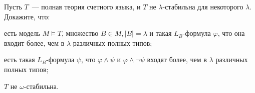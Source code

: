 Пусть $T$~--- полная теория счетного языка, и $T$ не $\lambda$-стабильна для некоторого
$\lambda$. Докажите, что:
\begin{enumcyr}
    \item есть модель $M \models T$, множество $B \in M, |B| = \lambda$ и такая $L_B$-формула $\varphi$,
        что она входит более, чем в $\lambda$ различных полных типов;
    \item есть такая $L_B$-формула $\psi$, что $\varphi \land \psi$ и $\varphi
        \land \neg \psi$ входят более, чем в $\lambda$ различных полных типов;
    \item $T$ не $\omega$-стабильна.
\end{enumcyr}
